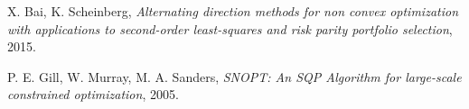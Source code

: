   	X. Bai, K. Scheinberg,
  	\emph{Alternating direction methods for non convex
  	optimization with applications to second-order
 	least-squares and risk parity portfolio selection},
  	2015.

	P. E. Gill, W. Murray, M. A. Sanders,
	\emph{SNOPT: An SQP Algorithm for large-scale constrained optimization}, 
	2005.
